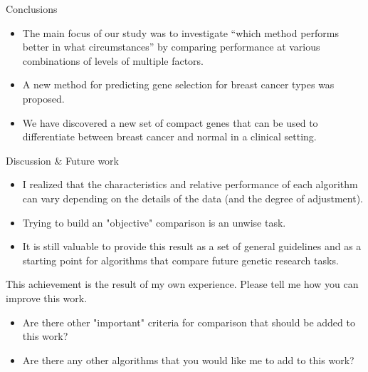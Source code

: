\documentclass[xcolor=table]{beamer}
\numberwithin{figure}{section}
\numberwithin{equation}{section}
\begin{document}
\begin{frame}[allowframebreaks]{Conclusions}
\begin{itemize}
    \item The main focus of our study was to investigate ``which method performs better in what circumstances'' by comparing performance at various combinations of levels of multiple factors.
    \item A new method for predicting gene selection for breast cancer types was proposed.
      \item We have discovered a new set of compact genes that can be used to differentiate between breast cancer and normal in a clinical setting.
 \end{itemize}
 \end{frame}

\begin{frame}[allowframebreaks]{Discussion \& Future work}
    \begin{itemize}
        \item I realized that the characteristics and relative performance of each algorithm can vary depending on the details of the data (and the degree of adjustment).
        \item Trying to build an "objective" comparison is an unwise task.
        \item It is still valuable to provide this result as a set of general guidelines and as a starting point for algorithms that compare future genetic research tasks.
    \end{itemize}
\framebreak
    This achievement is the result of my own experience. Please tell me how you can improve this work.
\begin{itemize}
    \item Are there other "important" criteria for comparison that should be added to this work?
    \item Are there any other algorithms that you would like me to add to this work? 
\end{itemize}
\end{frame}

\ThankYouFrame

\end{document}

